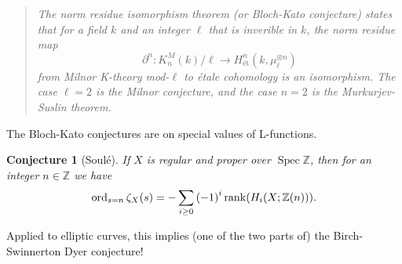 \documentclass[leqno, openany]{memoir}
\newtheorem{conj}[thm]{Conjecture}
\theoremstyle{definition}
\theoremstyle{remark}
\theoremstyle{plain}
\theoremstyle{definition}
\theoremstyle{remark}
\newcommand{\Z}{\mathbb{Z}}
\DeclareMathOperator{\Spec}{Spec}
\begin{document}
\begin{quotation}
    \textit{The norm residue isomorphism theorem (or Bloch-Kato conjecture) states that for a field $k$ and an integer $\ell$ that is inverible in $k$, the norm residue map
    \[ \partial^n \colon K_n^M(k)/\ell \to H_{\text{\'et}}^n(k, \mu_{\ell}^{\otimes n}) \]
    from Milnor K-theory mod-$\ell$ to \'etale cohomology is an isomorphism. The case $\ell=2$ is the Milnor conjecture, and the case $n=2$ is the Murkurjev-Suslin theorem.} 
\end{quotation}


The Bloch-Kato conjectures are on special values of L-functions.  
\begin{conj}[Soul\'e]
    If $X$ is regular and proper over $\Spec \Z$, then for an integer $n \in \Z$ we have
    \[ \operatorname{ord}_{s=n} \zeta_X(s) = - \sum_{i \geq 0} {(-1)}^i \rank (H_i(X; \Z(n))). \]
\end{conj}


Applied to elliptic curves, this implies (one of the two parts of) the Birch-Swinnerton Dyer conjecture!
\end{document}
